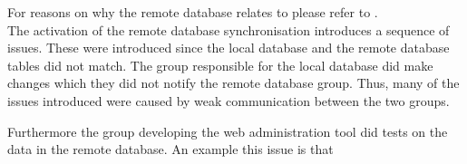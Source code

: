 For reasons on why the remote database relates to \launcher please refer to .\\

The activation of the remote database synchronisation introduces a sequence of issues. These were introduced since the local database and the remote database tables did not match. The group responsible for the local database did make changes which they did not notify the remote database group. Thus, many of the issues introduced were caused by weak communication between the two groups.

Furthermore the group developing the web administration tool did tests on the data in the remote database. An example this issue is that 